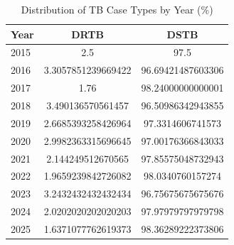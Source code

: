 \begin{table}[htbp]

\caption{Distribution of TB Case Types by Year (\%)}
\label{tab:type_by_year}
\begin{tabular}{lcc}

\toprule

Year & DRTB & DSTB \\

\midrule

2015 & 2.5 & 97.5 \\
2016 & 3.3057851239669422 & 96.69421487603306 \\
2017 & 1.76 & 98.24000000000001 \\
2018 & 3.490136570561457 & 96.50986342943855 \\
2019 & 2.6685393258426964 & 97.3314606741573 \\
2020 & 2.9982363315696645 & 97.00176366843033 \\
2021 & 2.144249512670565 & 97.85575048732943 \\
2022 & 1.9659239842726082 & 98.0340760157274 \\
2023 & 3.2432432432432434 & 96.75675675675676 \\
2024 & 2.0202020202020203 & 97.97979797979798 \\
2025 & 1.6371077762619373 & 98.36289222373806 \\

\bottomrule

\end{tabular}

\end{table}
